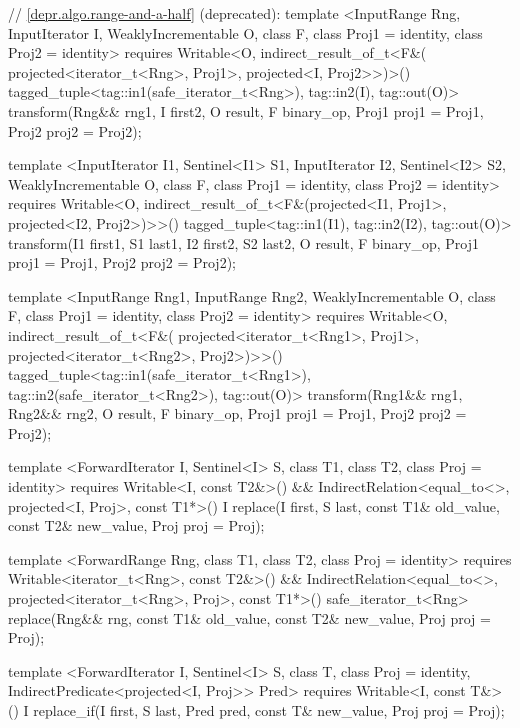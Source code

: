 \begin{codeblock}
{{{{  // \ref{depr.algo.range-and-a-half} (deprecated):
  template <InputRange Rng, InputIterator I, WeaklyIncrementable O, class F,
      class Proj1 = identity, class Proj2 = identity>
    requires Writable<O, indirect_result_of_t<F&(
      projected<iterator_t<Rng>, Proj1>, projected<I, Proj2>>)>()
    tagged_tuple<tag::in1(safe_iterator_t<Rng>), tag::in2(I), tag::out(O)>
      transform(Rng&& rng1, I first2, O result,
                F binary_op, Proj1 proj1 = Proj1{}, Proj2 proj2 = Proj2{});

  template <InputIterator I1, Sentinel<I1> S1, InputIterator I2, Sentinel<I2> S2,
      WeaklyIncrementable O, class F, class Proj1 = identity, class Proj2 = identity>
    requires Writable<O, indirect_result_of_t<F&(projected<I1, Proj1>,
      projected<I2, Proj2>)>>()
    tagged_tuple<tag::in1(I1), tag::in2(I2), tag::out(O)>
      transform(I1 first1, S1 last1, I2 first2, S2 last2, O result,
              F binary_op, Proj1 proj1 = Proj1{}, Proj2 proj2 = Proj2{});

  template <InputRange Rng1, InputRange Rng2, WeaklyIncrementable O, class F,
      class Proj1 = identity, class Proj2 = identity>
    requires Writable<O, indirect_result_of_t<F&(
      projected<iterator_t<Rng1>, Proj1>, projected<iterator_t<Rng2>, Proj2>)>>()
    tagged_tuple<tag::in1(safe_iterator_t<Rng1>),
                 tag::in2(safe_iterator_t<Rng2>),
                 tag::out(O)>
      transform(Rng1&& rng1, Rng2&& rng2, O result,
                F binary_op, Proj1 proj1 = Proj1{}, Proj2 proj2 = Proj2{});

  template <ForwardIterator I, Sentinel<I> S, class T1, class T2, class Proj = identity>
    requires Writable<I, const T2&>() &&
      IndirectRelation<equal_to<>, projected<I, Proj>, const T1*>()
    I
      replace(I first, S last, const T1& old_value, const T2& new_value, Proj proj = Proj{});

  template <ForwardRange Rng, class T1, class T2, class Proj = identity>
    requires Writable<iterator_t<Rng>, const T2&>() &&
      IndirectRelation<equal_to<>, projected<iterator_t<Rng>, Proj>, const T1*>()
    safe_iterator_t<Rng>
      replace(Rng&& rng, const T1& old_value, const T2& new_value, Proj proj = Proj{});

  template <ForwardIterator I, Sentinel<I> S, class T, class Proj = identity,
      IndirectPredicate<projected<I, Proj>> Pred>
    requires Writable<I, const T&>()
    I
      replace_if(I first, S last, Pred pred, const T& new_value, Proj proj = Proj{});

}}}}
\end{codeblock}

